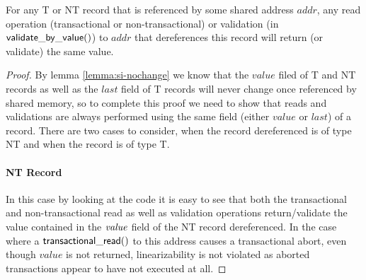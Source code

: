 \begin{lemma}
\label{lemma:si-samevalue}
For any T or NT record that is referenced by some shared address $\mathit{addr}$, any read operation
(transactional or non-transactional) or validation (in $\sf{validate\_by\_value}()$) to
$\mathit{addr}$ that dereferences this record will return (or validate) the same value.
\end{lemma}
\begin{proof}
By lemma \ref{lemma:si-nochange} we know that the $\mathit{value}$ filed of T and NT records as well as the $\mathit{last}$ field
of T records will never change once referenced by shared memory, so to complete this proof we need to show that reads and validations
are always performed using the same field (either $\mathit{value}$ or $\mathit{last}$) of a record.
There are two cases to consider, when the record dereferenced is of type NT and when the record is of type T.
\paragraph{NT Record} In this case by looking at the code it is easy to see that both the transactional and non-transactional read
as well as validation operations
return/validate the value contained in the $\ms{value}$ field of the NT record dereferenced.
In the case where a $\sf{transactional\_read}()$ to this address causes a transactional abort,
even though $\mathit{value}$ is not returned, linearizability is not violated
as aborted transactions appear to have not executed at all.

\end{proof}
